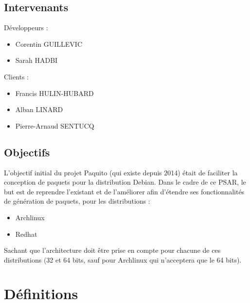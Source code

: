 \documentclass[12pt,a4paper]{article}
\begin{document}
\subsection{Intervenants}
Développeurs :
\begin{itemize}\renewcommand{\labelitemi}{$\bullet$}
\item Corentin GUILLEVIC 
\item Sarah HADBI
\end{itemize}
Clients :
\begin{itemize}\renewcommand{\labelitemi}{$\bullet$}
\item Francis HULIN-HUBARD
\item Alban LINARD
\item Pierre-Arnaud SENTUCQ
\end{itemize}

\subsection{Objectifs}

L'objectif initial du projet Paquito (qui existe depuis 2014) était de faciliter la conception de paquets pour la distribution Debian. Dans le cadre de ce PSAR, le but est de reprendre l'existant et de l'améliorer afin d'étendre ses fonctionnalités de génération de paquets, pour les distributions :
\begin{itemize}\renewcommand{\labelitemi}{$\bullet$}
\item Archlinux 
\item Redhat
\end{itemize}
Sachant que l'architecture doit être prise en compte pour chacune de ces distributions (32 et 64 bits, sauf pour Archlinux qui n'acceptera que le 64 bits).

\section{Définitions}
\end{document}

